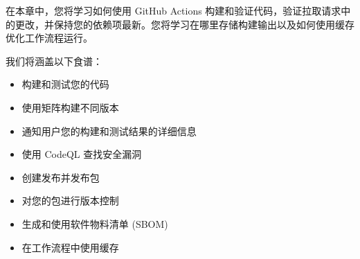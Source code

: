在本章中，您将学习如何使用 GitHub Actions 构建和验证代码，验证拉取请求中的更改，并保持您的依赖项最新。您将学习在哪里存储构建输出以及如何使用缓存优化工作流程运行。

我们将涵盖以下食谱：

\begin{itemize}
\item 
构建和测试您的代码

\item 
使用矩阵构建不同版本

\item 
通知用户您的构建和测试结果的详细信息

\item 
使用 CodeQL 查找安全漏洞

\item 
创建发布并发布包

\item 
对您的包进行版本控制

\item 
生成和使用软件物料清单 (SBOM)

\item 
在工作流程中使用缓存
\end{itemize}


